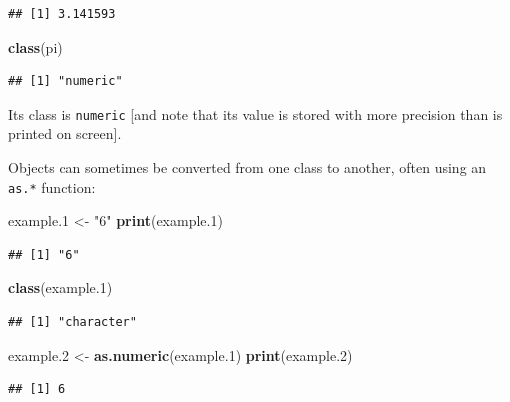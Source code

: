\documentclass[
]{article}
\newenvironment{Shaded}{\begin{snugshade}}{\end{snugshade}}
\newcommand{\FloatTok}[1]{\textcolor[rgb]{0.00,0.00,0.81}{#1}}
\newcommand{\KeywordTok}[1]{\textcolor[rgb]{0.13,0.29,0.53}{\textbf{#1}}}
\newcommand{\NormalTok}[1]{#1}
\newcommand{\StringTok}[1]{\textcolor[rgb]{0.31,0.60,0.02}{#1}}
\begin{document}
\begin{verbatim}
## [1] 3.141593
\end{verbatim}

\begin{Shaded}
\begin{Highlighting}[]
\KeywordTok{class}\NormalTok{(pi)}
\end{Highlighting}
\end{Shaded}

\begin{verbatim}
## [1] "numeric"
\end{verbatim}

Its class is \texttt{numeric} {[}and note that its value is stored with more precision than is printed on screen{]}.

Objects can sometimes be converted from one class to another, often using an \texttt{as.*} function:

\begin{Shaded}
\begin{Highlighting}[]
\NormalTok{example}\FloatTok{.1}\NormalTok{ <{-}}\StringTok{ "6"}
\KeywordTok{print}\NormalTok{(example}\FloatTok{.1}\NormalTok{)}
\end{Highlighting}
\end{Shaded}

\begin{verbatim}
## [1] "6"
\end{verbatim}

\begin{Shaded}
\begin{Highlighting}[]
\KeywordTok{class}\NormalTok{(example}\FloatTok{.1}\NormalTok{)}
\end{Highlighting}
\end{Shaded}

\begin{verbatim}
## [1] "character"
\end{verbatim}

\begin{Shaded}
\begin{Highlighting}[]
\NormalTok{example}\FloatTok{.2}\NormalTok{ <{-}}\StringTok{ }\KeywordTok{as.numeric}\NormalTok{(example}\FloatTok{.1}\NormalTok{)}
\KeywordTok{print}\NormalTok{(example}\FloatTok{.2}\NormalTok{)}
\end{Highlighting}
\end{Shaded}

\begin{verbatim}
## [1] 6
\end{verbatim}
\end{document}
